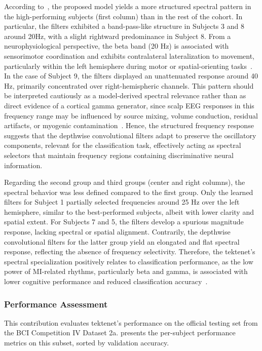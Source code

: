 According to~, the proposed model yields a more structured spectral pattern in the high-performing subjects (first column) than in the rest of the cohort. In particular, the filters exhibited a band-pass-like structure in Subjects 3 and 8 around 20Hz, with a slight rightward predominance in Subject 8. From a neurophysiological perspective, the beta band (20 Hz) is associated with sensorimotor coordination and exhibits contralateral lateralization to movement, particularly within the left hemisphere during motor or spatial-orienting tasks~\cite{lasaponara2020pre}. In the case of Subject 9, the filters displayed an unattenuated response around {40 Hz}, primarily concentrated {over right-hemispheric channels}. {This pattern should be interpreted cautiously as a model-derived spectral relevance rather than as direct evidence of a cortical gamma generator, since scalp EEG responses in this frequency range may be influenced by source mixing, volume conduction, residual artifacts, or myogenic contamination~\cite{Whitham2007Scalp}.} Hence, the structured frequency response suggests that the depthwise convolutional filters adapt to preserve the oscillatory components, relevant for the classification task, effectively acting as spectral selectors that maintain frequency regions containing discriminative neural information.

Regarding the second group and third groups (center and right columns), the spectral behavior was less defined compared to the first group. Only the learned filters for Subject 1 partially selected frequencies around 25 Hz over the left hemisphere, similar to the best-performed subjects, albeit with lower clarity and spatial extent. For Subjects 7 and 5, the filters develop a spurious magnitude response, lacking spectral or spatial alignment. Contrarily, the depthwise convolutional filters for the latter group yield an elongated and flat spectral response, reflecting the absence of frequency selectivity. Therefore, the \gls{tektenet}'s spectral specialization positively relates to classification performance, as the low power of MI-related rhythms, particularly beta and gamma, is associated with lower cognitive performance and reduced classification accuracy~\cite{bakhtiari2023power, avital2024cognitive}.

\subsubsection{Performance Assessment}

{This contribution evaluates} \gls{tektenet}'s performance on the official testing set from the BCI Competition IV Dataset 2a.  presents the per-subject performance metrics on this subset, sorted by validation accuracy.

